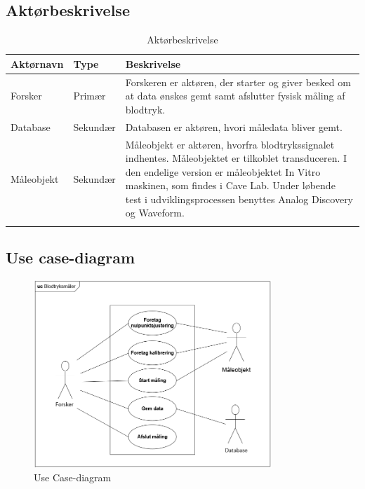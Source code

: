 \subsection{Aktørbeskrivelse}

\begin{table}[H]
\begin{tabularx}{\textwidth}{l l X}
     Aktørnavn	&	Type		&	Beskrivelse \\ \midrule
     Forsker   	& 	Primær  	& 	Forskeren er aktøren, der starter og giver besked om at data ønskes gemt samt afslutter fysisk måling af blodtryk. \\ 			  \addlinespace[2mm]
     Database	&	Sekundær	&	Databasen er aktøren, hvori måledata bliver gemt. \\   \addlinespace[2mm]
     Måleobjekt	&	Sekundær	&	Måleobjekt er aktøren, hvorfra blodtrykssignalet indhentes. Måleobjektet er tilkoblet transduceren. 
     I den endelige version er måleobjektet In Vitro maskinen, som findes i Cave Lab.
     Under løbende test i udviklingsprocessen benyttes Analog Discovery og Waveform. \\   \addlinespace[2mm]
     
   
     \bottomrule                                                                                                                   
    \end{tabularx}
    \caption {Aktørbeskrivelse}
    \label{tab:aktoerbeskrivelse}
	
\end{table}

\subsection{Use case-diagram}

\begin{figure}[H]
	\centering
	\includegraphics[width=0.8\textwidth]{Figurer/UseCasediagram}
	\caption{Use Case-diagram}
	\label{fig:Use Cases}
\end{figure}

